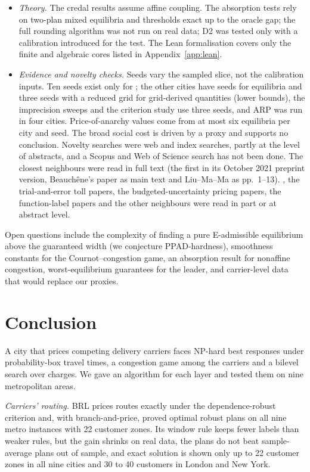 \documentclass[preprint,12pt]{elsarticle}
\theoremstyle{definition}
\theoremstyle{remark}
\begin{document}
\begin{itemize}[leftmargin=*,itemsep=2pt]
\item \emph{Theory.} The credal results assume affine coupling. The absorption tests rely on two-plan mixed equilibria and thresholds exact up to the oracle gap; the full rounding algorithm was not run on real data; D2 was tested only with a calibration introduced for the test. The Lean formalisation covers only the finite and algebraic cores listed in Appendix~\ref{app:lean}.
\item \emph{Evidence and novelty checks.} Seeds vary the sampled slice, not the calibration inputs. Ten seeds exist only for \TenFullCities; the other cities have \TenRedSeedsMax{} seeds for equilibria and three seeds with a reduced grid for grid-derived quantities (lower bounds), the imprecision sweeps and the criterion study use three seeds, and ARP was run in four cities. Price-of-anarchy values come from at most six equilibria per city and seed. The broad social cost is driven by a proxy and supports no conclusion. Novelty searches were web and index searches, partly at the level of abstracts, and a Scopus and Web of Science search has not been done. The closest neighbours \citep{GhosalHoWiesemann2024,Masiha2026,Feik2026,Beauchene2016,LiuMaMa2026,Irnich2008} were read in full text (the first in its October 2021 preprint version, Beauch\^ene's paper as main text and Liu--Ma--Ma as pp.\ 1--13). \citet{Lanzetti2025}, the trial-and-error toll papers, the budgeted-uncertainty pricing papers, the function-label papers \citep{Dabia2013,Ioachim1998} and the other neighbours were read in part or at abstract level.
\end{itemize}
Open questions include the complexity of finding a pure E-admissible equilibrium above the guaranteed width (we conjecture PPAD-hardness), smoothness constants for the Cournot--congestion game, an absorption result for nonaffine congestion, worst-equilibrium guarantees for the leader, and carrier-level data that would replace our proxies.

\section{Conclusion}\label{sec:conclusion}

A city that prices competing delivery carriers faces NP-hard best responses under probability-box travel times, a congestion game among the carriers and a bilevel search over charges. We gave an algorithm for each layer and tested them on nine metropolitan areas.

\emph{Carriers' routing.} BRL prices routes exactly under the dependence-robust criterion and, with branch-and-price, proved optimal robust plans on all nine metro instances with 22 customer zones. Its window rule keeps fewer labels than weaker rules, but the gain shrinks on real data, the plans do not beat sample-average plans out of sample, and exact solution is shown only up to 22 customer zones in all nine cities and 30 to 40 customers in London and New York.
\end{document}
